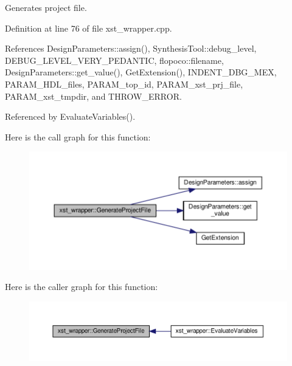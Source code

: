 Generates project file. 



Definition at line 76 of file xst\+\_\+wrapper.\+cpp.



References Design\+Parameters\+::assign(), Synthesis\+Tool\+::debug\+\_\+level, D\+E\+B\+U\+G\+\_\+\+L\+E\+V\+E\+L\+\_\+\+V\+E\+R\+Y\+\_\+\+P\+E\+D\+A\+N\+T\+IC, flopoco\+::filename, Design\+Parameters\+::get\+\_\+value(), Get\+Extension(), I\+N\+D\+E\+N\+T\+\_\+\+D\+B\+G\+\_\+\+M\+EX, P\+A\+R\+A\+M\+\_\+\+H\+D\+L\+\_\+files, P\+A\+R\+A\+M\+\_\+top\+\_\+id, P\+A\+R\+A\+M\+\_\+xst\+\_\+prj\+\_\+file, P\+A\+R\+A\+M\+\_\+xst\+\_\+tmpdir, and T\+H\+R\+O\+W\+\_\+\+E\+R\+R\+OR.



Referenced by Evaluate\+Variables().

Here is the call graph for this function\+:
\nopagebreak
\begin{figure}[H]
\begin{center}
\leavevmode
\includegraphics[width=350pt]{d8/dd6/classxst__wrapper_a4f64eada1880d6a4e235de5c5e6dc299_cgraph}
\end{center}
\end{figure}
Here is the caller graph for this function\+:
\nopagebreak
\begin{figure}[H]
\begin{center}
\leavevmode
\includegraphics[width=350pt]{d8/dd6/classxst__wrapper_a4f64eada1880d6a4e235de5c5e6dc299_icgraph}
\end{center}
\end{figure}
\mbox{\label{classxst__wrapper_a855756749f4d6ba8b04072b3f9439c10}} 
